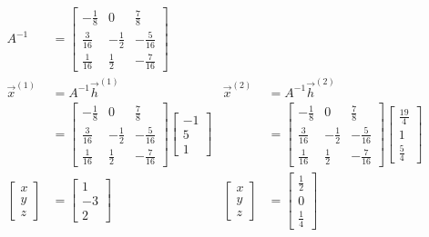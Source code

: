 \begin{Answer}
\begin{align*}
A^{-1}&=
\begin{bmatrix}
-\frac{1}{8} & 0 & \frac{7}{8}\\
\frac{3}{16} & -\frac{1}{2} & -\frac{5}{16}\\
\frac{1}{16} & \frac{1}{2} & -\frac{7}{16}
\end{bmatrix} & & \\
\vec{x}^{(1)} &= A^{-1}\vec{h}^{(1)} & \vec{x}^{(2)} &= A^{-1}\vec{h}^{(2)} \\
&=
\begin{bmatrix}
-\frac{1}{8} & 0 & \frac{7}{8}\\
\frac{3}{16} & -\frac{1}{2} & -\frac{5}{16}\\
\frac{1}{16} & \frac{1}{2} & -\frac{7}{16}    
\end{bmatrix}
\begin{bmatrix}
-1 \\
5 \\
1
\end{bmatrix}
&
&=
\begin{bmatrix}
-\frac{1}{8} & 0 & \frac{7}{8}\\
\frac{3}{16} & -\frac{1}{2} & -\frac{5}{16}\\
\frac{1}{16} & \frac{1}{2} & -\frac{7}{16}    
\end{bmatrix}
\begin{bmatrix}
\frac{19}{4} \\
1 \\
\frac{5}{4}
\end{bmatrix} \\
\begin{bmatrix}
x\\
y\\
z
\end{bmatrix}
&=
\begin{bmatrix}
1\\
-3\\
2    
\end{bmatrix}
&
\begin{bmatrix}
x\\
y\\
z
\end{bmatrix}
&=
\begin{bmatrix}
\frac{1}{2}\\
0\\
\frac{1}{4}    
\end{bmatrix}
\end{align*}
\end{Answer}

